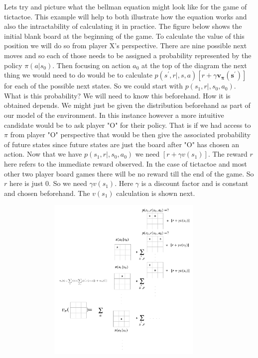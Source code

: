 Lets try and picture what the bellman equation might look like for the game of tictactoe. This example will help to both illustrate how the equation works and also the intractability of calculating it in practice. The figure below shows the initial blank board at the beginning of the game. To calculate the value of this position we will do so from player X's perspective. There are nine possible next moves and so each of those needs to be assigned a probability represented by the policy $\pi(a | s_{0})$. Then focusing on action $a_{0}$ at the top of the diagram the next thing we would need to do would be to calculate $p(s^{'},r|,s,a)[ r + \gamma \mathbf{v_{\pi}(s^{'})}]$ for each of the possible next states. So we could start with $p(s_{1},r|,s_{0},a_{0})$. What is this probability? We will need to know this beforehand. How it is obtained depends. We might just be given the distribution beforehand as part of our model of the environment. In this instance however a more intuitive candidate would be to ask player "O" for their policy. That is if we had access to $\pi$ from player "O" perspective that would be then give the associated probability of future states since future states are just the board after "O" has chosen an action. Now that we have $p(s_{1},r|,s_{0},a_{0})$ we need $[r + \gamma v(s_{1})]$. The reward $r$ here refers to the immediate reward observed. In the case of tictactoe and most other two player board games there will be no reward till the end of the game. So $r$ here is just 0. So we need $\gamma v(s_{1})$. Here $\gamma$ is a discount factor and is constant and chosen beforehand. The $v(s_{1})$ calculation is shown next. 

\begin{figure}[H]
        \centering
        \includegraphics[width=400px,height=300px]{images/PolicyEvaluationExample/intractable_value_function.png}
        \caption{}
        \label{fig:my_label}
\end{figure}

